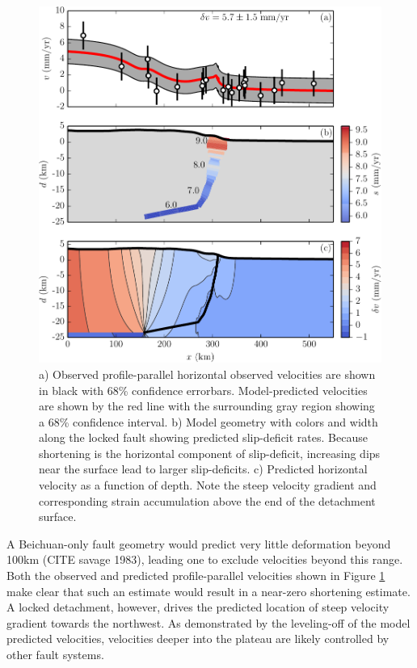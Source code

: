 \documentclass[12pt]{article}
\begin{document}
\begin{figure}[h!]
    \centering
    \includegraphics{figs/stack_figure_all_details.pdf}
    \caption{a) Observed profile-parallel horizontal observed velocities are shown in black with 68\% confidence errorbars. Model-predicted velocities are shown by the red line with the surrounding gray region showing a 68\% confidence interval. b) Model geometry with colors and width along the locked fault showing predicted slip-deficit rates. Because shortening is the horizontal component of slip-deficit, increasing dips near the surface lead to larger slip-deficits. c) Predicted horizontal velocity as a function of depth. Note the steep velocity gradient and corresponding strain accumulation above the end of the detachment surface.}
    \label{fig:big_stack}
\end{figure}


A Beichuan-only fault geometry would predict very little deformation beyond 100km (CITE savage 1983), leading one to exclude velocities beyond this range. Both the observed and predicted profile-parallel velocities shown in Figure \ref{fig:big_stack} make clear that such an estimate would result in a near-zero shortening estimate. A locked detachment, however, drives the predicted location of steep velocity gradient towards the northwest. As demonstrated by the leveling-off of the model predicted velocities, velocities deeper into the plateau are likely controlled by other fault systems.
\end{document}
